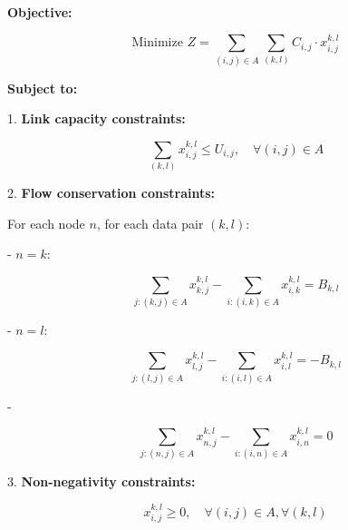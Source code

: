 \documentclass{article}
\begin{document}
\textbf{Objective:}

\[
\text{Minimize } Z = \sum_{(i,j) \in A} \sum_{(k,l)} C_{i,j} \cdot x_{i,j}^{k,l}
\]

\textbf{Subject to:}

1. \textbf{Link capacity constraints:}

\[
\sum_{(k,l)} x_{i,j}^{k,l} \leq U_{i,j}, \quad \forall (i,j) \in A
\]

2. \textbf{Flow conservation constraints:}

For each node \( n \), for each data pair \( (k,l) \):

-  \( n = k \):

\[
\sum_{j : (k,j) \in A} x_{k,j}^{k,l} - \sum_{i : (i,k) \in A} x_{i,k}^{k,l} = B_{k,l}
\]

-  \( n = l \):

\[
\sum_{j : (l,j) \in A} x_{l,j}^{k,l} - \sum_{i : (i,l) \in A} x_{i,l}^{k,l} = -B_{k,l}
\]

- 

\[
\sum_{j : (n,j) \in A} x_{n,j}^{k,l} - \sum_{i : (i,n) \in A} x_{i,n}^{k,l} = 0
\]

3. \textbf{Non-negativity constraints:}

\[
x_{i,j}^{k,l} \geq 0, \quad \forall (i,j) \in A, \forall (k,l)
\]
\end{document}
